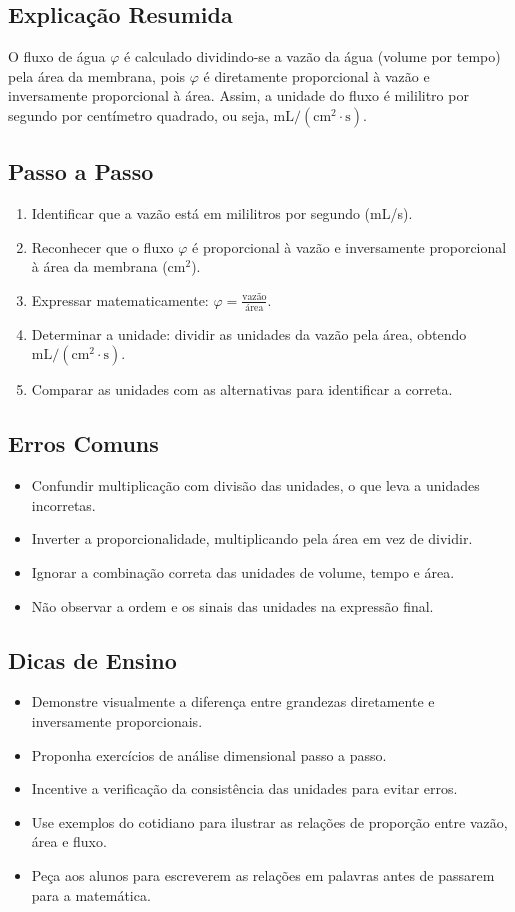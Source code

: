 \documentclass{article}
\begin{document}
\subsection*{Explicação Resumida}
O fluxo de água $\varphi$ é calculado dividindo-se a vazão da água (volume por tempo) pela área da membrana, pois $\varphi$ é diretamente proporcional à vazão e inversamente proporcional à área. Assim, a unidade do fluxo é mililitro por segundo por centímetro quadrado, ou seja, $\mathrm{mL/(cm^{2} \cdot s)}$.

\subsection*{Passo a Passo}
\begin{enumerate}
  \item Identificar que a vazão está em mililitros por segundo (mL/s).
  \item Reconhecer que o fluxo $\varphi$ é proporcional à vazão e inversamente proporcional à área da membrana (cm$^2$).
  \item Expressar matematicamente: $\varphi = \frac{\text{vazão}}{\text{área}}$.
  \item Determinar a unidade: dividir as unidades da vazão pela área, obtendo $\mathrm{mL/(cm^{2} \cdot s)}$.
  \item Comparar as unidades com as alternativas para identificar a correta.
\end{enumerate}

\subsection*{Erros Comuns}
\begin{itemize}
  \item Confundir multiplicação com divisão das unidades, o que leva a unidades incorretas.
  \item Inverter a proporcionalidade, multiplicando pela área em vez de dividir.
  \item Ignorar a combinação correta das unidades de volume, tempo e área.
  \item Não observar a ordem e os sinais das unidades na expressão final.
\end{itemize}

\subsection*{Dicas de Ensino}
\begin{itemize}
  \item Demonstre visualmente a diferença entre grandezas diretamente e inversamente proporcionais.
  \item Proponha exercícios de análise dimensional passo a passo.
  \item Incentive a verificação da consistência das unidades para evitar erros.
  \item Use exemplos do cotidiano para ilustrar as relações de proporção entre vazão, área e fluxo.
  \item Peça aos alunos para escreverem as relações em palavras antes de passarem para a matemática.
\end{itemize}
\end{document}
